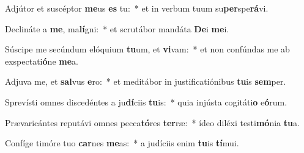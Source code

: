 \item Adjútor et suscéptor \textbf{me}us \textbf{es} tu:~* et in verbum tuum su\textbf{per}spe\textbf{rá}vi.
\item Declináte a \textbf{me}, ma\textbf{lí}gni:~* et scrutábor mandáta \textbf{De}i \textbf{me}i.
\item Súscipe me secúndum elóquium \textbf{tu}um, et \textbf{vi}vam:~* et non confúndas me ab exspectati\textbf{ó}ne \textbf{me}a.
\item Adjuva me, et \textbf{sal}vus \textbf{e}ro:~* et meditábor in justificatiónibus \textbf{tu}is \textbf{sem}per.
\item Sprevísti omnes discedéntes a ju\textbf{dí}ciis \textbf{tu}is:~* quia injústa cogitáti\textbf{o} e\textbf{ó}rum.
\item Prævaricántes reputávi omnes pecca\textbf{tó}res \textbf{ter}ræ:~* ídeo diléxi testi\textbf{mó}nia \textbf{tu}a.
\item Confíge timóre tuo \textbf{car}nes \textbf{me}as:~* a judíciis enim \textbf{tu}is \textbf{tí}mui.
